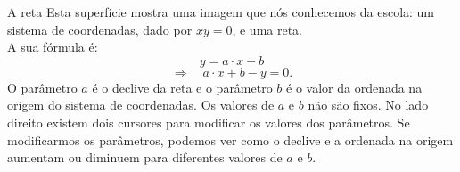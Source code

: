 \begin{surferPage}[A Reta]{A reta}
Esta superf\'icie mostra uma imagem que n\'os conhecemos da escola: um sistema de coordenadas, dado por $xy=0$, e uma reta. \\A sua f\'ormula \'e:
\[y=a\cdot x + b\]
\[ \Rightarrow \quad a\cdot x +b -y=0.\]
O par\^ametro $a$ \'e o declive da reta e o par\^ametro $b$ \'e o valor da ordenada na origem do sistema de coordenadas.
\newline \newline
Os valores de $a$ e $b$ n\~ao s\~ao fixos. No lado direito existem dois cursores para modificar os valores dos par\^ametros. Se  modificarmos os par\^ametros,  podemos ver como o declive e a ordenada na origem aumentam ou diminuem para diferentes valores de $a$ e $b$.
\end{surferPage}

